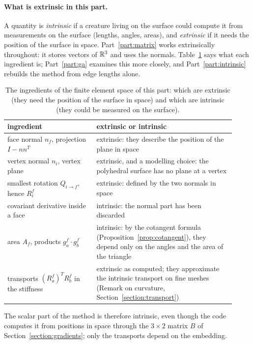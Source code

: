 \paragraph{What is extrinsic in this part.} A quantity is \emph{intrinsic} if a creature living on the surface could compute it from measurements on the surface (lengths, angles, areas), and \emph{extrinsic} if it needs the position of the surface in space. Part~\ref{part:matrix} works extrinsically throughout: it stores vectors of $\mathbb{R}^3$ and uses the normals. Table~\ref{tab:r1_extrinsic} says what each ingredient is; Part~\ref{part:ga} examines this more closely, and Part~\ref{part:intrinsic} rebuilds the method from edge lengths alone.
\begin{table}[t]
\centering
\caption{The ingredients of the finite element space of this part: which are extrinsic (they need the position of the surface in space) and which are intrinsic (they could be measured on the surface).}
\label{tab:r1_extrinsic}
\footnotesize
\setlength{\tabcolsep}{3pt}
\begin{tabular}{>{\raggedright\arraybackslash}p{0.36\linewidth} >{\raggedright\arraybackslash}p{0.56\linewidth}}
\toprule
ingredient & extrinsic or intrinsic \\
\midrule
face normal $n_f$, projection $I - nn^T$ & extrinsic: they describe the position of the plane in space \\
vertex normal $n_i$, vertex plane & extrinsic, and a modelling choice: the polyhedral surface has no plane at a vertex \\
smallest rotation $Q_{i\to f}$, hence $R_i^f$ & extrinsic: defined by the two normals in space \\
covariant derivative inside a face & intrinsic: the normal part has been discarded \\
area $A_f$, products $g_a^f\cdot g_b^f$ & intrinsic: by the cotangent formula (Proposition~\ref{prop:cotangent}), they depend only on the angles and the area of the triangle \\
transports $(R_a^f)^TR_b^f$ in the stiffness & extrinsic as computed; they approximate the intrinsic transport on fine meshes (Remark on curvature, Section~\ref{section:transport}) \\
\bottomrule
\end{tabular}
\end{table}
The scalar part of the method is therefore intrinsic, even though the code computes it from positions in space through the $3\times 2$ matrix $B$ of Section~\ref{section:gradients}; only the transports depend on the embedding.

